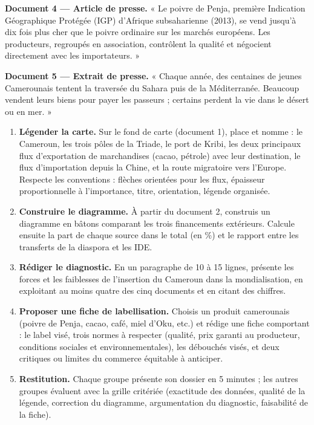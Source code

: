 \documentclass[11pt]{article}
\newcommand{\cle}[1]{{\popxbold\color{popdark}#1}}
\newcounter{popsec}
\newcounter{popsub}
\newcommand{\courssub}[1]{%
  \stepcounter{popsub}%
  \par\vspace{9pt}\noindent{\popxbold\fontsize{11.5}{13}\selectfont\color{popink}{\color{poporange}\thepopsec.\thepopsub}\hspace{6pt}#1}\par\nopagebreak\vspace{4pt}
}
\begin{document}
\textbf{Document 4 — Article de presse.} « Le poivre de Penja, première Indication Géographique Protégée (IGP) d'Afrique subsaharienne (2013), se vend jusqu'à dix fois plus cher que le poivre ordinaire sur les marchés européens. Les producteurs, regroupés en association, contrôlent la qualité et négocient directement avec les importateurs. »

\textbf{Document 5 — Extrait de presse.} « Chaque année, des centaines de jeunes Camerounais tentent la traversée du Sahara puis de la Méditerranée. Beaucoup vendent leurs biens pour payer les passeurs ; certains perdent la vie dans le désert ou en mer. »

\courssub{Consignes}

\begin{enumerate}
\item \textbf{Légender la carte.} Sur le fond de carte (document 1), place et nomme : le Cameroun, les trois pôles de la Triade, le port de Kribi, les deux principaux flux d'exportation de marchandises (cacao, pétrole) avec leur destination, le flux d'importation depuis la Chine, et la route migratoire vers l'Europe. Respecte les conventions : flèches orientées pour les flux, épaisseur proportionnelle à l'importance, titre, orientation, légende organisée.
\item \textbf{Construire le diagramme.} À partir du document 2, construis un diagramme en bâtons comparant les trois financements extérieurs. Calcule ensuite la part de chaque source dans le total (en \%) et le rapport entre les transferts de la diaspora et les IDE.
\item \textbf{Rédiger le diagnostic.} En un paragraphe de 10 à 15 lignes, présente les \cle{forces} et les \cle{faiblesses} de l'insertion du Cameroun dans la mondialisation, en exploitant au moins quatre des cinq documents et en citant des chiffres.
\item \textbf{Proposer une fiche de labellisation.} Choisis un produit camerounais (poivre de Penja, cacao, café, miel d'Oku, etc.) et rédige une fiche comportant : le label visé, trois normes à respecter (qualité, prix garanti au producteur, conditions sociales et environnementales), les débouchés visés, et deux critiques ou limites du commerce équitable à anticiper.
\item \textbf{Restitution.} Chaque groupe présente son dossier en 5 minutes ; les autres groupes évaluent avec la grille critériée (exactitude des données, qualité de la légende, correction du diagramme, argumentation du diagnostic, faisabilité de la fiche).
\end{enumerate}
\end{document}
